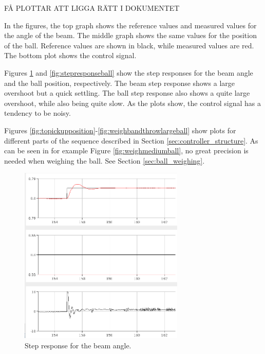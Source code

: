 
FÅ PLOTTAR ATT LIGGA RÄTT I DOKUMENTET

In the figures, the top graph shows the reference values and measured values for the angle of the beam. 
The middle graph shows the same values for the position of the ball. 
Reference values are shown in black, while measured values are red. 
The bottom plot shows the control signal.

Figures \ref{fig:stepresponsebeam} and \ref{fig:stepresponseball} show the step responses for the beam angle and the ball position, respectively. 
The beam step response shows a large overshoot but a quick settling.
The ball step response also shows a quite large overshoot, while also being quite slow.
As the plots show, the control signal has a tendency to be noisy.

Figures \ref{fig:topickupposition}-\ref{fig:weighbandthrowlargeball} show plots for different parts of the sequence described in Section \ref{sec:controller_structure}.
As can be seen in for example Figure \ref{fig:weighmediumball}, no great precision is needed when weighing the ball. See Section \ref{sec:ball_weighing}.

\begin{figure}[h]
\centering
\includegraphics[width=0.7\textwidth]{figures/stepresponsebeam-crop.png}
\caption{Step response for the beam angle.}
\label{fig:stepresponsebeam}
\end{figure}

